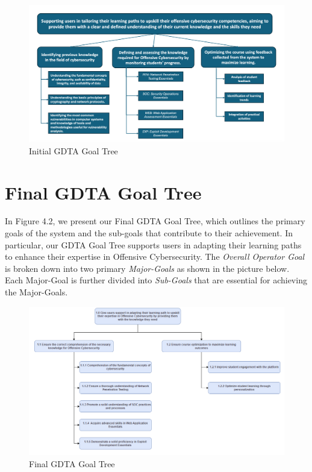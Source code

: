 \begin{figure}[H]
    \centering
    \includegraphics[width=\textwidth]{./assets/initialgdta.png}
    \caption{Initial GDTA Goal Tree}
    \label{fig:Initial GDTA}
\end{figure}

\newpage
\section{Final GDTA Goal Tree}
In Figure 4.2, we present our Final GDTA Goal Tree, which outlines the primary goals of the system and the sub-goals that contribute to their achievement. In particular, our GDTA Goal Tree supports users in adapting their learning paths to enhance their expertise in Offensive Cybersecurity.
The \textit{Overall Operator Goal} is broken down into two primary \textit{Major-Goals} as shown in the picture below. Each Major-Goal is further divided into \textit{Sub-Goals} that are essential for achieving the Major-Goals. 

\begin{figure}[H]
    \centering
    \includegraphics[width=\textwidth]{./assets/GDTA.png}
    \caption{Final GDTA Goal Tree}
    \label{fig:GDTA}
\end{figure}

